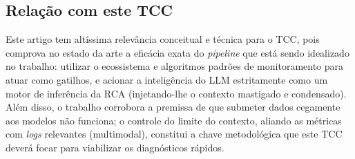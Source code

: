 \documentclass[12pt, a4paper]{article}
\begin{document}
\subsection*{Relação com este TCC}
Este artigo tem altíssima relevância conceitual e técnica para o TCC, pois comprova no estado da arte a eficácia exata do \textit{pipeline} que está sendo idealizado no trabalho: utilizar o ecossistema e algoritmos padrões de monitoramento para atuar como gatilhos, e acionar a inteligência do LLM estritamente como um motor de inferência da RCA (injetando-lhe o contexto mastigado e condensado). Além disso, o trabalho corrobora a premissa de que submeter dados cegamente aos modelos não funciona; o controle do limite do contexto, aliando as métricas com \textit{logs} relevantes (multimodal), constitui a chave metodológica que este TCC deverá focar para viabilizar os diagnósticos rápidos.
\end{document}
